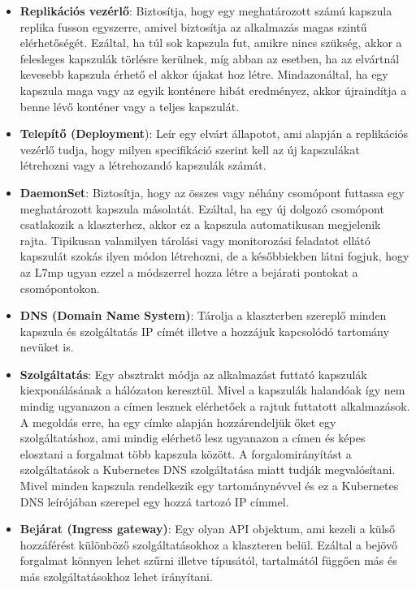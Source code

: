 \begin{itemize}
	\item \textbf{Replikációs vezérlő}: Biztosítja, hogy egy meghatározott számú 
	kapszula replika fusson egyszerre, amivel biztosítja az alkalmazás magas szintű
	elérhetőségét. Ezáltal, ha túl sok kapszula fut, amikre nincs szükség, 
	akkor a felesleges kapszulák törlésre kerülnek, míg abban az esetben, ha az elvártnál
	kevesebb kapszula érhető el akkor újakat hoz létre. Mindazonáltal, ha egy kapszula 
	maga vagy az egyik konténere hibát eredményez, akkor újraindítja a benne lévő 
	konténer vagy a teljes kapszulát. 
	\item \textbf{Telepítő (Deployment}): Leír egy elvárt állapotot, ami alapján a
	replikációs vezérlő tudja, hogy milyen specifikáció szerint kell az új kapszulákat
	létrehozni vagy a létrehozandó kapszulák számát. 
	\item \textbf{DaemonSet}: Biztosítja, hogy az összes vagy néhány csomópont 
	futtassa egy meghatározott kapszula másolatát. Ezáltal, ha egy új dolgozó csomópont 
	csatlakozik a klaszterhez, akkor ez a kapszula automatikusan megjelenik rajta. 
	Tipikusan valamilyen tárolási vagy monitorozási feladatot ellátó kapszulát szokás 
	ilyen módon létrehozni, de a későbbiekben látni fogjuk, hogy az L7mp ugyan ezzel a 
	módszerrel hozza létre a bejárati pontokat a csomópontokon.
	\item \textbf{DNS (Domain Name System)}: Tárolja a klaszterben szereplő minden 
	kapszula és szolgáltatás IP címét illetve a hozzájuk kapcsolódó tartomány nevüket 
	is.  
	\item \textbf{Szolgáltatás}: Egy absztrakt módja az alkalmazást futtató kapszulák
	kiexponálásának a hálózaton keresztül. Mivel a kapszulák halandóak így nem mindig
	ugyanazon a címen lesznek elérhetőek a rajtuk futtatott alkalmazások. A megoldás
	erre, ha egy címke alapján hozzárendeljük őket egy szolgáltatáshoz, ami mindig 
	elérhető lesz ugyanazon a címen és képes elosztani a forgalmat több kapszula között.
	A forgalomirányítást a szolgáltatások a Kubernetes DNS szolgáltatása miatt tudják 
	megvalósítani. Mivel minden kapszula rendelkezik egy tartománynévvel és ez a 
	Kubernetes DNS leírójában szerepel egy hozzá tartozó IP címmel.
	\item \textbf{Bejárat (Ingress gateway)}: Egy olyan API objektum, ami kezeli a 
	külső hozzáférést különböző szolgáltatásokhoz a klaszteren belül. Ezáltal a bejövő 
	forgalmat könnyen lehet szűrni illetve típusától, tartalmától függően más és más 
	szolgáltatásokhoz lehet irányítani. 

\end{itemize}
